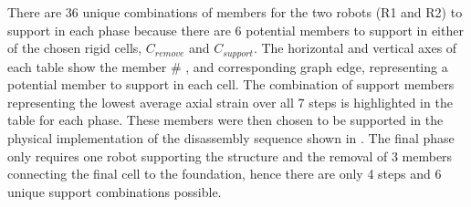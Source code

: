     There are $36$ unique combinations of members for the two robots (R1 and R2) to support in each phase because there are 6 potential members to support in either of the chosen rigid cells, $C_{remove}$ and $C_{support}$. The horizontal and vertical axes of each table show the member \# , and corresponding graph edge, representing a potential member to support in each cell. The combination of support members representing the lowest average axial strain over all 7 steps is highlighted in the table for each phase. These members were then chosen to be supported in the physical implementation of the disassembly sequence shown in . The final phase only requires one robot supporting the structure and the removal of 3 members connecting the final cell to the foundation, hence there are only 4 steps and 6 unique support combinations possible.



